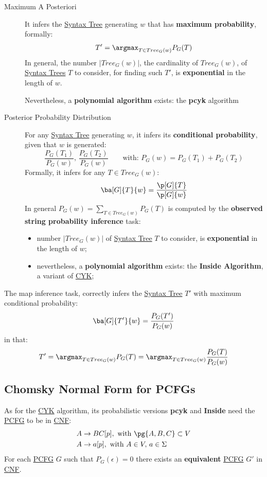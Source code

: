 \begin{description}
    \item[Maximum A Posteriori] It infers the \hyperref[def:pg-syntax-tree]{Syntax Tree} generating $w$ that has \textbf{maximum probability}, formally:
        \[
            T' = \argmax_{T\in Tree_G(w)}P_G(T)
        \]
        In general, the number $|Tree_G(w)|$, the cardinality of $Tree_G(w)$, of \hyperref[def:pg-syntax-tree]{Syntax Trees} $T$ to consider, for finding such $T'$, is \textbf{exponential} in the length of $w$.
        \begin{note}
            Nevertheless, a \textbf{polynomial algorithm} exists: the \textbf{\ac{pcyk}} algorithm
        \end{note}
    \item[Posterior Probability Distribution] For any \hyperref[def:pg-syntax-tree]{Syntax Tree} generating $w$, it infers its \textbf{conditional probability}, given that $w$ is generated:
        \[
            \frac{P_G(T_1)}{P_G(w)},\,\frac{P_G(T_2)}{P_G(w)} \qquad \text{with: }P_G(w) = P_G(T_1) + P_G(T_2)
        \]
        Formally, it infers for any $T\in Tree_G(w)$:
        \[
            \ba[G]{T}{w} = \dfrac{\p[G]{T}}{\p[G]{w}}
        \]
        In general $P_G(w) = \sum_{T\in Tree_G(w)}{P_G(T)}$ is computed by the \textbf{observed string probability inference} task:
        \begin{itemize}
            \item number $|Tree_G(w)|$ of \hyperref[def:pg-syntax-tree]{Syntax Tree} $T$ to consider, is \textbf{exponential} in the length of $w$;
            \item nevertheless, a \textbf{polynomial algorithm} exists: the \textbf{Inside Algorithm}, a variant of \hyperref[sub:ll_algoritmo_cyk]{CYK};
        \end{itemize}
\end{description}
\begin{note}
    The \ac{map} inference task, correctly infers the \hyperref[def:pg-syntax-tree]{Syntax Tree}  $T'$ with maximum conditional probability:
    \[
        \ba[G]{T'}{w} = \frac{P_G(T')}{P_G(w)}
    \]
    in that:
    \[
        T' = \argmax_{T\in Tree_G(w)}P_G(T) = \argmax_{T\in Tree_G(w)}\frac{P_G(T)}{P_G(w)}
    \]
\end{note}
%
\subsection{Chomsky Normal Form for PCFGs}\label{sub:in_chomsky_normal_form_for_pcfgs} %
As for the \hyperref[sub:ll_algoritmo_cyk]{CYK} algorithm, its probabilistic versions \textbf{\ac{pcyk}} and \textbf{Inside} need the \hyperref[def:pcfg]{PCFG} to be in \hyperref[def:cnf]{CNF}:
\[
    \begin{aligned}
        A&\to BC[p],\text{ with } \pg{A,B,C}\subset V \\
        A&\to a[p],\text{ with } A\in V,\, a\in\Sigma
    \end{aligned}
\]
For each \hyperref[def:pcfg]{PCFG} $G$ such that $P_G(\epsilon) = 0$ there exists an \textbf{equivalent} \hyperref[def:pcfg]{PCFG} $G'$ in \hyperref[def:cnf]{CNF}.
%

